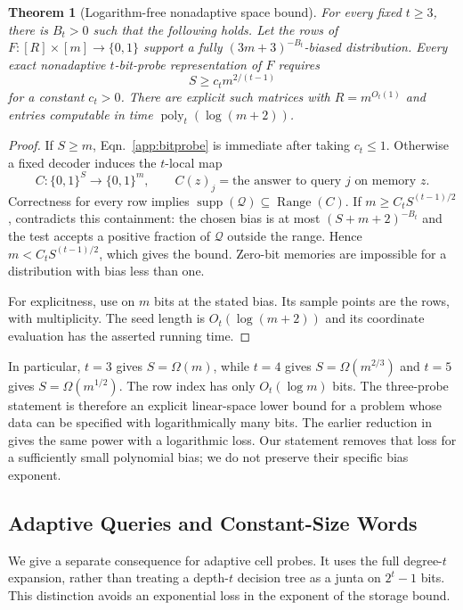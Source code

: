 \documentclass[letterpaper,11pt]{article}
\newtheorem{theorem}{Theorem}
\theoremstyle{definition}
\DeclareMathOperator{\supp}{supp}
\DeclareMathOperator{\poly}{poly}
\DeclareMathOperator{\Range}{Range}
\begin{document}
\begin{theorem}[Logarithm-free nonadaptive space bound]
\label{thm:bitprobe}
For every fixed $t\ge3$, there is $B_t>0$ such that the following holds.
Let the rows of $F:[R]\times[m]\to\{0,1\}$ support a fully
$(3m+3)^{-B_t}$-biased distribution. Every exact nonadaptive
$t$-bit-probe representation of $F$ requires
\begin{equation}\label{app:bitprobe}
 S\ge c_t m^{2/(t-1)}
\end{equation}
for a constant $c_t>0$. There are explicit such matrices with
$R=m^{O_t(1)}$ and entries computable in time $\poly_t(\log(m+2))$.
\end{theorem}
\begin{proof}
If $S\ge m$, Eqn.~\eqref{app:bitprobe} is immediate after taking
$c_t\le1$. Otherwise a fixed decoder induces the $t$-local map
\[
 C:\{0,1\}^S\longrightarrow\{0,1\}^m,
 \qquad C(z)_j=\text{the answer to query }j\text{ on memory }z.
\]
Correctness for every row implies
$\supp(\mathcal Q)\subseteq\Range(C)$. If
$m\ge C_tS^{(t-1)/2}$,  contradicts this
containment: the chosen bias is at most $(S+m+2)^{-B_t}$ and
the test accepts a positive fraction of $\mathcal Q$ outside the range.
Hence $m<C_tS^{(t-1)/2}$, which gives the bound. Zero-bit memories
are impossible for a distribution with bias less than one.

For explicitness, use  on $m$ bits at
the stated bias. Its sample points are the rows, with multiplicity.
The seed length is $O_t(\log(m+2))$ and its coordinate evaluation
has the asserted running time.
\end{proof}

In particular, $t=3$ gives $S=\Omega(m)$, while $t=4$ gives
$S=\Omega(m^{2/3})$ and $t=5$ gives $S=\Omega(m^{1/2})$.
The row index has only $O_t(\log m)$ bits. The three-probe statement
is therefore an explicit linear-space lower bound for a problem
whose data can be specified with logarithmically many bits.
The earlier reduction in~\cite[Theorem~10]{GLY26} gives the same
power with a logarithmic loss. Our statement removes that loss for
a sufficiently small polynomial bias; we do not preserve their
specific bias exponent.

\subsection{Adaptive Queries and Constant-Size Words}

We give a separate consequence for adaptive cell probes. It uses the
full degree-$t$ expansion, rather than treating a depth-$t$ decision
tree as a junta on $2^t-1$ bits. This distinction avoids an exponential
loss in the exponent of the storage bound.
\end{document}

